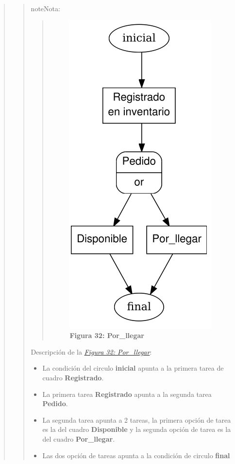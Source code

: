 \documentclass[letterpaper,11pt,spanish]{sphinxmanual}
\begin{document}
\begin{quote}
\begin{quote}
\begin{notice}{note}{Nota:}
\begin{quote}
\begin{figure}[htbp]
\includegraphics{grafo_inflow4.png}
\caption{\textbf{Figura 32: Por\_llegar}}\label{_templates/Contenido6/Parte4:figura32}\end{figure}
\end{quote}

Descripción de la {\hyperref[_templates/Contenido6/Parte4:figura32]{\emph{Figura 32: Por\_llegar}}}:
\begin{itemize}
\item {} 
La condición del circulo \textbf{inicial} apunta a la primera tarea de cuadro \textbf{Registrado}.

\item {} 
La primera tarea \textbf{Registrado} apunta a la segunda tarea \textbf{Pedido}.

\item {} 
La segunda tarea apunta a 2 tareas, la primera opción de tarea es la del cuadro \textbf{Disponible} y la segunda opción de tarea es la del cuadro \textbf{Por\_llegar}.

\item {} 
Las dos opción de tareas apunta a la condición de circulo \textbf{final}


\end{itemize}
\end{notice}
\end{quote}
\end{quote}
\end{document}
